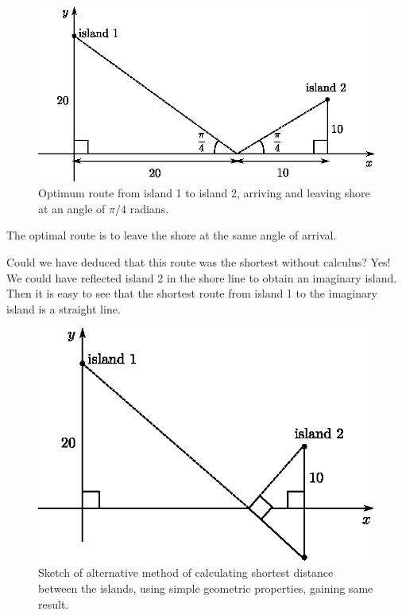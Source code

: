 \begin{example}
\begin{figure}[H]
\centering
\includegraphics[scale=0.7]{img/island-opt-route}
\caption{Optimum route from island 1 to island 2, arriving and leaving shore at an angle of $\pi/4$ radians.}
\label{fig:island-opt-route}
\end{figure}

The optimal route is to leave the shore at the same angle of arrival.

Could we have deduced that this route was the shortest without calculus? Yes! We could have reflected island 2 in the shore line to obtain an imaginary island. Then it is easy to see that the shortest route from island 1 to the imaginary island is a straight line.

\begin{figure}[H]
\centering
\includegraphics[scale=0.8]{img/island-alt-calc}
\caption{Sketch of alternative method of calculating shortest distance between the islands, using simple geometric properties, gaining same result.}
\label{fig:island-alt-calc}
\end{figure}

\end{example}

